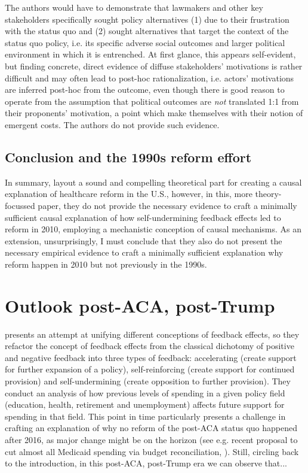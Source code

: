 \documentclass[11pt]{article}
\begin{document}
The authors would have to demonstrate that lawmakers and other key stakeholders specifically sought policy alternatives (1) due to their frustration with the status quo and (2) sought alternatives that target the context of the status quo policy, i.e. its specific adverse social outcomes and larger political environment in which it is entrenched. At first glance, this appears self-evident, but finding concrete, direct evidence of diffuse stakeholders' motivations is rather difficult and may often lead to post-hoc rationalization, i.e.  actors' motivations are inferred post-hoc from the outcome, even though there is good reason to operate from the assumption that political outcomes are \textit{not} translated 1:1 from their proponents' motivation, a point which \textcite[][]{Jacobs2014} make themselves with their notion of emergent costs. The authors do not provide such evidence.

\subsection*{Conclusion and the 1990s reform effort}

In summary, \textcite[][]{Jacobs2014} layout a sound and compelling theoretical part for creating a causal explanation of healthcare reform in the U.S., however, in this, more theory-focussed paper, they do not provide the necessary evidence to craft a minimally sufficient causal explanation of how self-undermining feedback effects led to reform in 2010, employing a mechanistic conception of causal mechanisms. As an extension, unsurprisingly, I must conclude that they also do not present the necessary empirical evidence to craft a minimally sufficient explanation why reform happen in 2010 but not previously in the 1990s.

\section*{Outlook post-ACA, post-Trump}

\textcite[][]{Busemeyer2019} presents an attempt at unifying different conceptions of feedback effects, so they refactor the concept of feedback effects from the classical dichotomy of positive and negative feedback into three types of feedback: accelerating (create support for further expansion of a policy), self-reinforcing (create support for continued provision) and self-undermining (create opposition to further provision). They conduct an analysis of how previous levels of spending in a given policy field (education, health, retirement and unemployment) affects future support for spending in that field. This point in time particularly presents a challenge in crafting an explanation of why no reform of the post-ACA status quo happened after 2016, as major change might be on the horizon (see e.g. recent proposal to cut almost all Medicaid spending via budget reconciliation, ). Still, circling back to the introduction, in this post-ACA, post-Trump era we can observe that...
\end{document}
